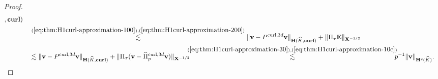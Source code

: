 \documentclass{article}
\newcommand{\hatPicurlcom}{\widehat \Pi^{\operatorname*{curl},3d}_p}
\begin{document}
\begin{proof}
\begin{align*}
{,\operatorname{\mathbf{curl}})}
\\
&\quad    \overset{(\ref{eq:thm:H1curl-approximation-100}),(\ref{eq:thm:H1curl-approximation-200})}
            {\lesssim}
\Vert {\mathbf v}-P^{\operatorname*{curl},3d}{\mathbf{v}}\Vert_{\mathbf{H}(\widehat{K}%
,\operatorname{\mathbf{curl}})}
+\Vert\Pi_{\tau}{\mathbf{E}}%
\Vert_{{\mathbf{X}}^{-1/2}}\\
& \quad \lesssim 
\Vert{\mathbf{v}}-P^{\operatorname*{curl},3d}{\mathbf{v}}\Vert_{\mathbf{H}(\widehat{K}%
,\operatorname{\mathbf{curl}})}+\Vert\Pi_{\tau}({\mathbf{v}}-\hatPicurlcom{\mathbf{v}})\Vert_{{\mathbf{X}}^{-1/2}}
  \!\!\!\! 
\overset{(\ref{eq:thm:H1curl-approximation-30}%
),(\ref{eq:thm:H1curl-approximation-10c})}{\lesssim}
\! \!\!\!
p^{-1}\Vert{\mathbf{v}%
}\Vert_{{\mathbf{H}}^{2}(\widehat{K})}.
\qedhere
\end{align*}
\end{proof}
\end{document}
